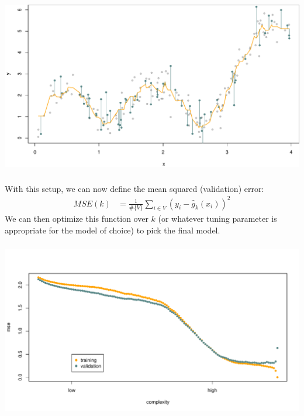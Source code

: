 \documentclass[xetex,mathserif,serif,aspectratio=169]{beamer}
\begin{document}
\begin{frame}[fragile] \frametitle{} \oldB \small

\begin{center}
\includegraphics[width=\textwidth]{img/valid7.pdf}
\end{center}

\end{frame}

\begin{frame}[fragile] \frametitle{} \oldB \small


With this setup, we can now define the mean squared (validation) error:
\begin{align*}
MSE(k) &= \frac{1}{\#\{V\}} \sum_{i \in V} \left(y_i - \widehat{g}_k(x_i) \right)^2
\end{align*}
We can then optimize this function over $k$ (or whatever tuning parameter
is appropriate for the model of choice) to pick the final model.

\end{frame}

\begin{frame}[fragile] \frametitle{} \oldB \small

\begin{center}
\includegraphics[width=\textwidth]{img/knnValid.pdf}
\end{center}

\end{frame}
\end{document}
